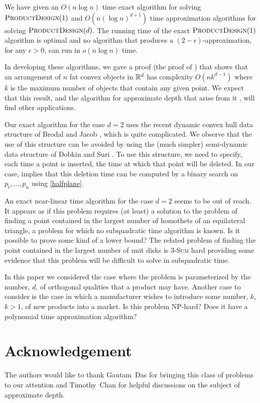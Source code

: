 \documentclass{llncs}
\newcommand{\eps}{\epsilon}
\begin{document}
We have given an $O(n\log n)$ time exact algorithm for solving
$\textsc{ProductDesign}(1)$ and $O(n(\log n)^{d+1})$ time approximation
algorithms for solving $\textsc{ProductDesign}(d)$.  The running time of
the exact $\textsc{ProductDesign}(1)$ algorithm is optimal and no algorithm
that produces a $(2-\eps)$-approximation, for any $\epsilon > 0$, can run
in $o(n\log n)$ time.  

In developing these algorithms, we gave a proof (the
proof of ) that shows that an arrangement of $n$ fat convex
objects in $\mathbb{R}^d$ has complexity $O(nk^{d-1})$ where $k$ is the maximum
number of objects that contain any given point. We expect that this result,
and the algorithm for approximate depth that arise from it \cite{ah08},
will find other applications.

Our exact algorithm for the case $d=2$ uses the recent dynamic convex
hull data structure of Brodal and Jacob \cite{bj02}, which is quite
complicated.  We observe that the use of this structure can be avoided
by using the (much simpler) semi-dynamic data structure of Dobkin and Suri
\cite{ds91}.  To use this structure, we need to specify, each time a point is
inserted, the time at which that point will be deleted.  In our case,
 implies that this deletion time can be computed by a
binary search on $p_t,\ldots,p_n$ using \eqref{halfplane}.

An exact near-linear time algorithm for the case $d=2$ seems to be out of
reach.  It appears as if this problem requires (at least) a solution to the
problem of finding a point contained in the largest number of homothets of
an equilateral triangle, a problem for which no subquadratic time algorithm
is known.  Is it possible to prove some kind of a lower bound?  The related
problem of finding the point contained in the largest number of unit disks
is \textsc{3-Sum} hard \cite{ah08} providing some evidence that this
problem will be difficult to solve in subquadratic time.

In this paper we considered the case where the problem is parameterized by
the number, $d$, of orthogonal qualities that a product may have.  Another
case to consider is the case in which a manufacturer wishes to introduce
some number, $k$, $k>1$, of new products into a market.   Is this problem
NP-hard?  Does it have a polynomial time approximation algorithm?


\section*{Acknowledgement}

The authors would like to thank Gautam~Das for bringing this class of
problems to our attention and Timothy~Chan for helpful discussions on
the subject of approximate depth.



\end{document}
